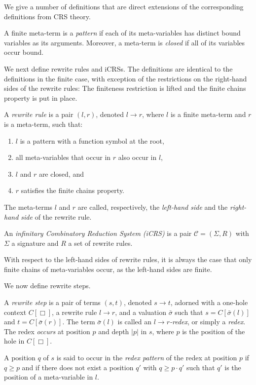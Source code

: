 \documentclass{LMCS}
\theoremstyle{plain}
\theoremstyle{definition}
\newcommand{\trsp}[3]{\mathcal{#1} = (#2, #3)}
\newcommand{\rew}{\rightarrow}
\begin{document}
We give a number of definitions that are direct extensions of the
corresponding definitions from CRS theory.

\begin{defi}
A finite meta-term is a \emph{pattern} if each of its meta-variables has distinct bound variables as its arguments. Moreover, a meta-term is \emph{closed} if all of its variables occur bound.
\end{defi}

We next define rewrite rules and iCRSs. The definitions are identical to the definitions in the finite case, with exception of the restrictions on the right-hand sides of the rewrite rules: The finiteness restriction is lifted and the finite chains property is put in place. 
\begin{defi}
A \emph{rewrite rule} is a pair $(l, r)$, denoted $l \rew r$, where $l$ is a finite meta-term and $r$ is a meta-term, such that:
\begin{enumerate}[(1)]
\item
$l$ is a pattern with a function symbol at the root,
\item
all meta-variables that occur in $r$ also occur in $l$, 
\item
$l$ and $r$ are closed, and
\item
$r$ satisfies the finite chains property.
\end{enumerate}
The meta-terms $l$ and $r$ are called, respectively, the \emph{left-hand side}
and the \emph{right-hand side} of the rewrite rule.

An \emph{infinitary Combinatory Reduction System (iCRS)} is a pair
$\trsp{C}{\Sigma}{R}$ with $\Sigma$ a signature and $R$ a set of rewrite rules.
\end{defi}

With respect to the left-hand sides of rewrite rules, it is always the case that only finite chains of meta-variables occur, as the left-hand sides are finite.

We now define rewrite steps.
\begin{defi}
A \emph{rewrite step} is a pair of terms $(s, t)$, denoted $s \rew t$, adorned with a one-hole context $C[\Box]$, a rewrite rule $l \rew r$, and a valuation $\bar{\sigma}$ such that $s = C[\bar{\sigma}(l)]$ and $t = C[\bar{\sigma}(r)]$.
The term
$\bar{\sigma}(l)$ is called an \emph{$l \rew r$-redex}, or
simply a \emph{redex}. The redex \emph{occurs} at position $p$ and
depth $|p|$ in $s$, where $p$ is the position of the hole in $C[\Box]$.

A position $q$ of $s$ is said to occur in the \emph{redex pattern} of
the redex at position $p$ if $q \geq p$ and if there does
not exist a position $q'$ with $q \geq p \cdot q'$ such that $q'$ is the
position of a meta-variable in $l$.
\end{defi}
\end{document}
